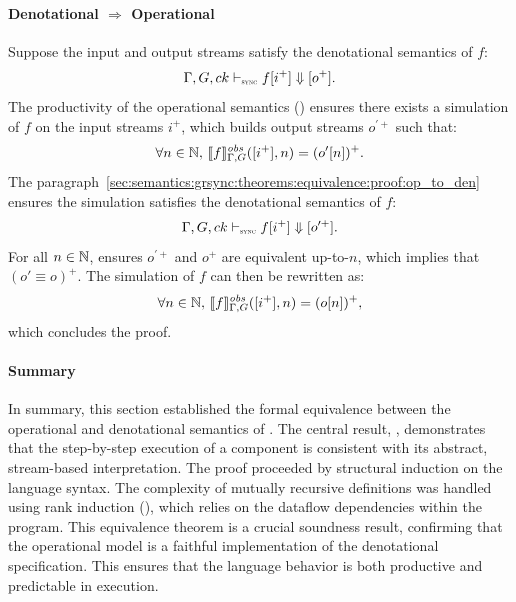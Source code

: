 \begin{skippableproof}
    \paragraph{Denotational $\Rightarrow$ Operational}
    Suppose the input and output streams satisfy the denotational semantics of $f$:
    $$\Gamma, G, ck \vdash_{\textnormal{\tiny\textsc{sync}}} f[i^+] \Downarrow [o^+].$$
    The productivity of the operational semantics () ensures
    there exists a simulation of $f$ on the input streams $i^+$, which builds output streams
    $o^{\prime+}$ such that: $$\forall n \in \mathbb{N}, \, \llbracket f \rrbracket^\textit{obs}_{\Gamma, G}([i^+], n) = (o'[n])^+.$$
    The paragraph~\ref{sec:semantics:grsync:theorems:equivalence:proof:op_to_den} ensures the simulation
    satisfies the denotational semantics of $f$: $$\Gamma, G, ck \vdash_{\textnormal{\tiny\textsc{sync}}} f[i^+] \Downarrow [o^{\prime+}].$$ For all
    $n \in \mathbb{N}$,  ensures $o^{\prime+}$ and $o^+$ are
    equivalent up-to-$n$, which implies that $(o' \equiv o)^+$. The simulation of $f$ can then be
    rewritten as: $$\forall n \in \mathbb{N}, \, \llbracket f \rrbracket^\textit{obs}_{\Gamma, G}([i^+], n) = (o[n])^+,$$
    which concludes the proof.

    \setcounter{paragraph}{0}
\end{skippableproof}

\paragraph{Summary}
In summary, this section established the formal equivalence between the operational and denotational
semantics of \GRSync.
%
The central result, , demonstrates that the
step-by-step execution of a component is consistent with its abstract, stream-based interpretation.
%
The proof proceeded by structural induction on the language syntax.
%
The complexity of mutually recursive definitions was handled using rank induction
(), which relies on the dataflow dependencies
within the program.
%
This equivalence theorem is a crucial soundness result, confirming that the operational model is a
faithful implementation of the denotational specification. This ensures that the language behavior
is both productive and predictable in execution.
